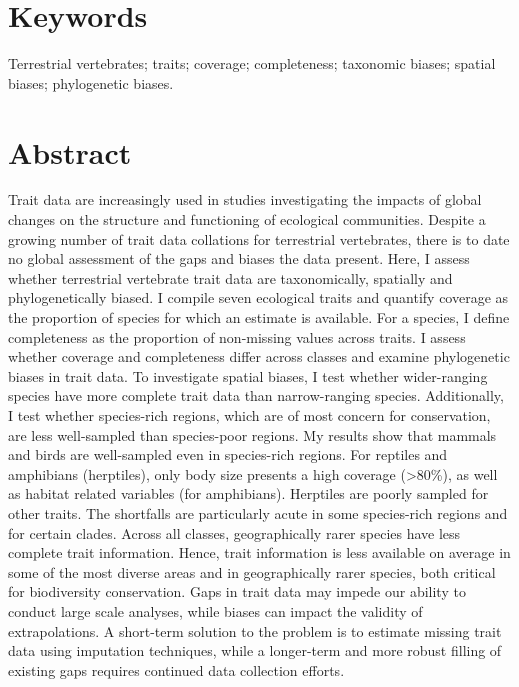 
\section*{Keywords}
Terrestrial vertebrates; traits; coverage; completeness; taxonomic biases; spatial biases; phylogenetic biases.

\section*{Abstract}
Trait data are increasingly used in studies investigating the impacts of global changes on the structure and functioning of ecological communities. Despite a growing number of trait data collations for terrestrial vertebrates, there is to date no global assessment of the gaps and biases the data present. Here, I assess whether terrestrial vertebrate trait data are taxonomically, spatially and phylogenetically biased. I compile seven ecological traits and quantify coverage as the proportion of species for which an estimate is available. For a species, I define completeness as the proportion of non-missing values across traits. I assess whether coverage and completeness differ across classes and examine phylogenetic biases in trait data. To investigate spatial biases, I test whether wider-ranging species have more complete trait data than narrow-ranging species. Additionally, I test whether species-rich regions, which are of most concern for conservation, are less well-sampled than species-poor regions.
My results show that mammals and birds are well-sampled even in species-rich regions. For reptiles and amphibians (herptiles), only body size presents a high coverage (>80\%), as well as habitat related variables (for amphibians). Herptiles are poorly sampled for other traits. The shortfalls are particularly acute in some species-rich regions and for certain clades. Across all classes, geographically rarer species have less complete trait information. Hence, trait information is less available on average in some of the most diverse areas and in geographically rarer species, both critical for biodiversity conservation. Gaps in trait data may impede our ability to conduct large scale analyses, while biases can impact the validity of extrapolations. A short-term solution to the problem is to estimate missing trait data using imputation techniques, while a longer-term and more robust filling of existing gaps requires continued data collection efforts.

